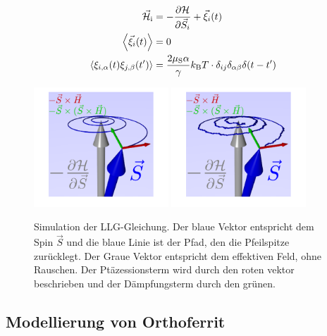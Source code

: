 \documentclass[main.tex]{subfiles}
\begin{document}
\begin{align}
	\vec{\mathcal{H}}_{\text{i}}                 & =
	-\pdv{\mathcal{H}}{\vec{S}_i} +
	\vec{\xi}_i(t)
	\\
	\expval{\vec{\xi}_i(t)}                      & = 0
	\\
	\expval{\xi_{i,\alpha}(t) \xi_{j,\beta}(t')} & = \frac{2\mu_\text{S}
		\alpha
	}{\gamma}k_\text{B} T \cdot \delta_{ij} \delta_{\alpha \beta}
	\delta(t-t')
\end{align}

\begin{figure}[H]
	\centering
	{\includegraphics[width=0.45\textwidth]{bilder/jschlege/LLG_T0_labeled.png}}
	{\includegraphics[width=0.45\textwidth]{bilder/jschlege/LLG_labeled.png}}
	\caption{Simulation der LLG-Gleichung. Der blaue Vektor entspricht dem Spin \(\vec{S}\) und die blaue Linie ist der Pfad, den die Pfeilspitze zurücklegt. Der Graue Vektor entspricht dem effektiven Feld, ohne Rauschen. Der Ptäzessionsterm wird durch den roten vektor beschrieben und der Dämpfungsterm durch den grünen. \cite{schlegel-master}}
	\label{fig:llg-rauschen}
\end{figure}

\subsection{Modellierung von Orthoferrit}
\end{document}
